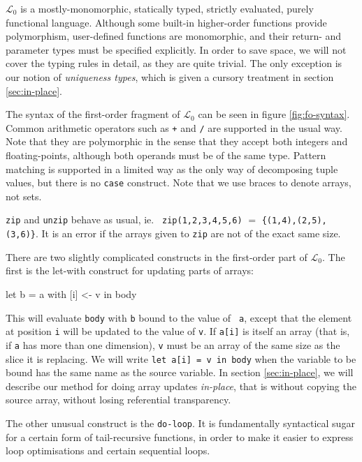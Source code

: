\documentclass{sigplanconf}  %
\newcommand{\LO}{$\mathcal{L}_0$}
\begin{document}
\LO{} is a mostly-monomorphic, statically typed, strictly evaluated,
purely functional language.  Although some built-in higher-order
functions provide polymorphism, user-defined functions are
monomorphic, and their return- and parameter types must be specified
explicitly.  In order to save space, we will not cover the typing
rules in detail, as they are quite trivial.  The only exception is our
notion of {\em uniqueness types}, which is given a cursory treatment
in section \ref{sec:in-place}.

The syntax of the first-order fragment of \LO{} can be seen in figure
\ref{fig:fo-syntax}.  Common arithmetic operators such as {\tt +} and
{\tt /} are supported in the usual way.  Note that they are
polymorphic in the sense that they accept both integers and
floating-points, although both operands must be of the same type.
Pattern matching is supported in a limited way as the only way of
decomposing tuple values, but there is no {\tt case} construct.  Note
that we use braces to denote arrays, not sets.

{\tt zip} and {\tt unzip} behave as usual, ie. {\tt
  zip({1,2,3},{4,5,6})} $=$ {\tt \{{(1,4),(2,5),(3,6)}\}}.  It
is an error if the arrays given to {\tt zip} are not of the exact same
size.

There are two slightly complicated constructs in the first-order part
of \LO{}.  The first is the let-with construct for updating parts of
arrays:

\begin{colorcode}
let b = a with [i] <- v in body
\end{colorcode}

This will evaluate {\tt body} with {\tt b} bound to the value of {\tt
  a}, except that the element at position {\tt i} will be updated to
the value of {\tt v}.  If {\tt a[i]} is itself an array (that is, if
{\tt a} has more than one dimension), {\tt v} must be an array of the
same size as the slice it is replacing.  We will write {\tt let a[i] =
  v in body} when the variable to be bound has the same name as the
source variable.  In section \ref{sec:in-place}, we will describe our
method for doing array updates {\em in-place}, that is without copying
the source array, without losing referential transparency.

The other unusual construct is the {\tt do-loop}.  It is fundamentally
syntactical sugar for a certain form of tail-recursive functions, in
order to make it easier to express loop optimisations and certain
sequential loops.
\end{document}
